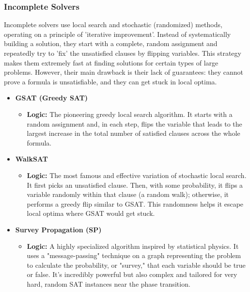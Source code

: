 \documentclass[12pt, a4paper, oneside]{report} %
\begin{document}
\subsubsection{Incomplete Solvers}
Incomplete solvers use local search and stochastic (randomized) methods, operating on a principle of 'iterative improvement'. Instead of systematically building a solution, they start with a complete, random assignment and repeatedly try to 'fix' the unsatisfied clauses by flipping variables. This strategy makes them extremely fast at finding solutions for certain types of large problems. However, their main drawback is their lack of guarantees: they cannot prove a formula is unsatisfiable, and they can get stuck in local optima.
\begin{itemize}
    \item \textbf{GSAT (Greedy SAT)} \cite{Selman1992}
    \begin{itemize}
        \item \textbf{Logic:} The pioneering greedy local search algorithm. It starts with a random assignment and, in each step, flips the variable that leads to the largest increase in the total number of satisfied clauses across the whole formula.
    \end{itemize}
    \item \textbf{WalkSAT} \cite{Kautz1996}
    \begin{itemize}
        \item \textbf{Logic:} The most famous and effective variation of stochastic local search. It first picks an unsatisfied clause. Then, with some probability, it flips a variable randomly within that clause (a random walk); otherwise, it performs a greedy flip similar to GSAT. This randomness helps it escape local optima where GSAT would get stuck.
    \end{itemize}
    \item \textbf{Survey Propagation (SP)} \cite{Mezard2002}
    \begin{itemize}
        \item \textbf{Logic:} A highly specialized algorithm inspired by statistical physics. It uses a "message-passing" technique on a graph representing the problem to calculate the probability, or "survey," that each variable should be true or false. It's incredibly powerful but also complex and tailored for very hard, random SAT instances near the phase transition.
    \end{itemize}


\end{itemize}
\end{document}
